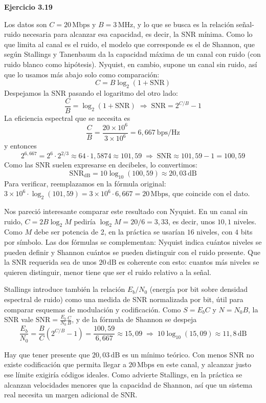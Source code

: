 \documentclass[11pt,a4paper]{article}
\begin{document}
\vspace{0.3cm}
\noindent\textbf{Ejercicio 3.19}\par
Los datos son $C = 20\,\mathrm{Mbps}$ y $B = 3\,\mathrm{MHz}$, y lo que se busca es la relación señal-ruido necesaria para alcanzar esa capacidad, es decir, la SNR mínima. Como lo que limita al canal es el ruido, el modelo que corresponde es el de Shannon, que según Stallings y Tanenbaum da la capacidad máxima de un canal con ruido (con ruido blanco como hipótesis). Nyquist, en cambio, supone un canal sin ruido, así que lo usamos más abajo solo como comparación:
\[
  C = B\log_2(1+\mathrm{SNR})
\]
Despejamos la SNR pasando el logaritmo del otro lado:
\[
  \frac{C}{B}=\log_2(1+\mathrm{SNR})
  \;\Longrightarrow\;
  \mathrm{SNR}=2^{C/B}-1
\]
La eficiencia espectral que se necesita es
\[
  \frac{C}{B}=\frac{20\times10^{6}}{3\times10^{6}}=6{,}667~\mathrm{bps/Hz}
\]
y entonces
\[
  2^{6{,}667}=2^{6}\cdot2^{2/3}\approx64\cdot1{,}5874\approx101{,}59
  \;\Longrightarrow\;
  \mathrm{SNR}\approx101{,}59-1=100{,}59
\]
Como las SNR suelen expresarse en decibeles, lo convertimos:
\[
  \mathrm{SNR}_{\mathrm{dB}}=10\log_{10}(100{,}59)\approx\boxed{20{,}03\,\mathrm{dB}}
\]
Para verificar, reemplazamos en la fórmula original: $3\times10^{6}\cdot\log_2(101{,}59)=3\times10^{6}\cdot6{,}667=20\,\mathrm{Mbps}$, que coincide con el dato.

Nos pareció interesante comparar este resultado con Nyquist. En un canal sin ruido, $C=2B\log_2M$ pediría $\log_2M=20/6=3{,}33$, es decir, unos $10{,}1$ niveles. Como $M$ debe ser potencia de 2, en la práctica se usarían $16$ niveles, con $4$ bits por símbolo. Las dos fórmulas se complementan: Nyquist indica cuántos niveles se pueden definir y Shannon cuántos se pueden distinguir con el ruido presente. Que la SNR requerida sea de unos $20\,\mathrm{dB}$ es coherente con esto: cuantos más niveles se quieren distinguir, menor tiene que ser el ruido relativo a la señal.

Stallings introduce también la relación $E_b/N_0$ (energía por bit sobre densidad espectral de ruido) como una medida de SNR normalizada por bit, útil para comparar esquemas de modulación y codificación. Como $S=E_bC$ y $N=N_0B$, la SNR vale $\mathrm{SNR}=\frac{E_b}{N_0}\frac{C}{B}$, y de la fórmula de Shannon se despeja
\[
  \frac{E_b}{N_0}=\frac{B}{C}\left(2^{C/B}-1\right)=\frac{100{,}59}{6{,}667}\approx15{,}09
  \;\Rightarrow\;10\log_{10}(15{,}09)\approx11{,}8\,\mathrm{dB}
\]

Hay que tener presente que $20{,}03\,\mathrm{dB}$ es un mínimo teórico. Con menos SNR no existe codificación que permita llegar a $20\,\mathrm{Mbps}$ en este canal, y alcanzar justo ese límite exigiría códigos ideales. Como advierte Stallings, en la práctica se alcanzan velocidades menores que la capacidad de Shannon, así que un sistema real necesita un margen adicional de SNR.
\end{document}

